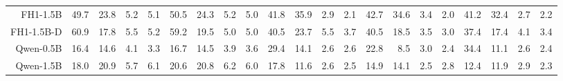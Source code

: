 \begin{table}[t]
{\begin{tabular}{rrrrr|rrrr|rrrr|rrrr|rrrr}
FH1-1.5B & \cellcolor[HTML]{E0ECCC}49.7 & \cellcolor[HTML]{FDE7CC}23.8 & \cellcolor[HTML]{F9CFCC}5.2 & \cellcolor[HTML]{F9CFCC}5.1 & \cellcolor[HTML]{DCEBCC}50.5 & \cellcolor[HTML]{FDE9CC}24.3 & \cellcolor[HTML]{F9D0CC}5.2 & \cellcolor[HTML]{F9CFCC}5.0 & \cellcolor[HTML]{DDEBCC}41.8 & \cellcolor[HTML]{E9EECC}35.9 & \cellcolor[HTML]{F9D0CC}2.9 & \cellcolor[HTML]{F8CFCC}2.1 & \cellcolor[HTML]{DAEBCC}42.7 & \cellcolor[HTML]{EBEECC}34.6 & \cellcolor[HTML]{F9D0CC}3.4 & \cellcolor[HTML]{F8CECC}2.0 & \cellcolor[HTML]{DEECCC}41.2 & \cellcolor[HTML]{F0EFCC}32.4 & \cellcolor[HTML]{F9CFCC}2.7 & \cellcolor[HTML]{F8CFCC}2.2 \\
FH1-1.5B-D & \cellcolor[HTML]{CCE8CC}60.9 & \cellcolor[HTML]{FCE0CC}17.8 & \cellcolor[HTML]{F9CFCC}5.5 & \cellcolor[HTML]{F9CFCC}5.2 & \cellcolor[HTML]{CCE8CC}59.2 & \cellcolor[HTML]{FCE3CC}19.5 & \cellcolor[HTML]{F9CFCC}5.0 & \cellcolor[HTML]{F9CFCC}5.0 & \cellcolor[HTML]{E0ECCC}40.5 & \cellcolor[HTML]{FFF0CC}23.7 & \cellcolor[HTML]{F9D4CC}5.5 & \cellcolor[HTML]{F9D1CC}3.7 & \cellcolor[HTML]{DEECCC}40.5 & \cellcolor[HTML]{FDE8CC}18.5 & \cellcolor[HTML]{F9D0CC}3.5 & \cellcolor[HTML]{F9CFCC}3.0 & \cellcolor[HTML]{E6EDCC}37.4 & \cellcolor[HTML]{FDE6CC}17.4 & \cellcolor[HTML]{F9D2CC}4.1 & \cellcolor[HTML]{F9D0CC}3.4 \\
Qwen-0.5B & \cellcolor[HTML]{FBDECC}16.4 & \cellcolor[HTML]{FBDBCC}14.6 & \cellcolor[HTML]{F8CECC}4.1 & \cellcolor[HTML]{F8CCCC}3.3 & \cellcolor[HTML]{FCDFCC}16.7 & \cellcolor[HTML]{FBDCCC}14.5 & \cellcolor[HTML]{F8CECC}3.9 & \cellcolor[HTML]{F8CECC}3.6 & \cellcolor[HTML]{F7F0CC}29.4 & \cellcolor[HTML]{FCE1CC}14.1 & \cellcolor[HTML]{F9D0CC}2.6 & \cellcolor[HTML]{F9CFCC}2.6 & \cellcolor[HTML]{FEEECC}22.8 & \cellcolor[HTML]{FAD8CC}8.5 & \cellcolor[HTML]{F9CFCC}3.0 & \cellcolor[HTML]{F8CECC}2.4 & \cellcolor[HTML]{ECEECC}34.4 & \cellcolor[HTML]{FBDCCC}11.1 & \cellcolor[HTML]{F9CFCC}2.6 & \cellcolor[HTML]{F9CFCC}2.4 \\
Qwen-1.5B & \cellcolor[HTML]{FCE0CC}18.0 & \cellcolor[HTML]{FCE4CC}20.9 & \cellcolor[HTML]{F9D0CC}5.7 & \cellcolor[HTML]{F9D0CC}6.1 & \cellcolor[HTML]{FCE4CC}20.6 & \cellcolor[HTML]{FDE5CC}20.8 & \cellcolor[HTML]{F9D1CC}6.2 & \cellcolor[HTML]{F9D1CC}6.0 & \cellcolor[HTML]{FDE7CC}17.8 & \cellcolor[HTML]{FBDDCC}11.6 & \cellcolor[HTML]{F9CFCC}2.6 & \cellcolor[HTML]{F9CFCC}2.5 & \cellcolor[HTML]{FCE2CC}14.9 & \cellcolor[HTML]{FCE1CC}14.1 & \cellcolor[HTML]{F8CECC}2.5 & \cellcolor[HTML]{F9CFCC}2.8 & \cellcolor[HTML]{FBDECC}12.4 & \cellcolor[HTML]{FBDECC}11.9 & \cellcolor[HTML]{F9D0CC}2.9 & \cellcolor[HTML]{F8CFCC}2.3 \\

\end{tabular}}
\end{table}
